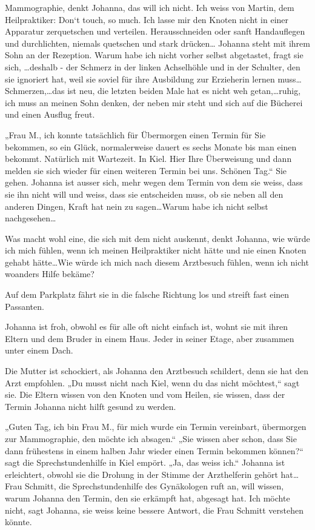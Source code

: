 \documentclass[10pt,titlepage,a5paper]{book}
\begin{document}
Mammographie, denkt Johanna, das will ich nicht. Ich weiss von Martin, dem  Heilpraktiker: Don`t touch, so much. Ich lasse mir den Knoten nicht in einer Apparatur zerquetschen und verteilen. Herausschneiden oder sanft Handauflegen und durchlichten, niemals quetschen und stark drücken\dots 
Johanna steht mit ihrem Sohn an der Rezeption. Warum habe ich nicht vorher selbst abgetastet, fragt sie sich, \dots deshalb - der Schmerz in der linken Achselhöhle und in der Schulter, den sie ignoriert hat, weil sie soviel für ihre Ausbildung zur Erzieherin lernen muss\dots  Schmerzen,\dots  das ist neu, die letzten beiden Male hat es nicht weh getan,\dots ruhig, ich muss an meinen Sohn denken, der neben mir steht und sich auf die Bücherei und einen Ausflug freut.

„Frau M., ich konnte tatsächlich für Übermorgen einen Termin für Sie bekommen, so ein Glück, normalerweise dauert es sechs Monate bis man einen bekommt. Natürlich mit Wartezeit. In Kiel. Hier Ihre Überweisung und dann melden sie sich wieder für einen weiteren Termin bei uns. Schönen Tag.“
Sie gehen. Johanna ist ausser sich, mehr wegen dem Termin von dem sie weiss, dass sie ihn nicht will und weiss, dass sie entscheiden muss, ob sie neben all den anderen Dingen, Kraft hat nein zu sagen\dots  Warum habe ich nicht selbst nachgesehen\dots 

Was macht wohl eine, die sich mit dem nicht auskennt, denkt Johanna, wie würde ich mich fühlen, wenn ich meinen Heilpraktiker nicht hätte und nie einen Knoten gehabt hätte\dots  Wie würde ich mich nach diesem Arztbesuch fühlen, wenn ich nicht woanders Hilfe bekäme?

Auf dem Parkplatz fährt sie in die falsche Richtung los und streift fast einen Passanten.

Johanna ist froh, obwohl es für alle oft nicht einfach ist, wohnt sie mit ihren Eltern und dem Bruder in einem Haus. Jeder in seiner Etage, aber zusammen unter einem Dach.

Die Mutter ist schockiert, als Johanna den Arztbesuch schildert, denn sie hat den Arzt empfohlen. „Du musst nicht nach Kiel, wenn du das nicht möchtest,“ sagt sie. Die Eltern wissen von den Knoten und vom Heilen, sie wissen, dass der Termin Johanna nicht hilft gesund zu werden.

„Guten Tag, ich bin Frau M., für mich wurde ein Termin vereinbart, übermorgen zur Mammographie, den möchte ich absagen.“ „Sie wissen aber schon, dass Sie dann frühestens in einem halben Jahr wieder einen Termin bekommen können?“ sagt die Sprechstundenhilfe in Kiel empört. „Ja, das weiss ich.“ Johanna ist erleichtert, obwohl sie die Drohung in der Stimme der Arzthelferin gehört hat\dots  Frau Schmitt, die Sprechstundenhilfe des Gynäkologen ruft an, will wissen, warum Johanna den Termin, den sie erkämpft hat, abgesagt hat. Ich möchte nicht, sagt Johanna, sie weiss keine bessere Antwort, die Frau Schmitt verstehen könnte.
\end{document}
